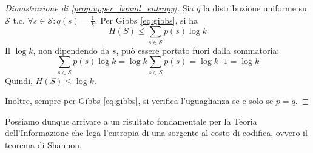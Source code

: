 \begin{proof}[Dimostrazione di \ref{prop:upper_bound_entropy}]
  Sia $q$ la distribuzione uniforme su $\mathcal{S}$ t.c. $\forall s \in \mathcal{S}:q(s)=\frac{1}{k}$.
  Per Gibbs \ref{eq:gibbs}, si ha $$H(S)\leq \sum_{s \in \mathcal{S}}{p(s)\log k}$$ 
  Il $\log k$, non dipendendo da $s$, può essere portato fuori dalla sommatoria: $$\sum_{s \in \mathcal{S}}{p(s)\log k} = \log k \sum_{s \in \mathcal{S}}{p(s)}=\log k\cdot1=\log k$$ 
  Quindi, $H(S)\leq \log k$. 
  
  Inoltre, sempre per Gibbs \ref{eq:gibbs}, si verifica l'uguaglianza se e solo se $p=q$. 
\end{proof}

Possiamo dunque arrivare a un risultato fondamentale per la Teoria dell'Informazione che lega l'entropia di una sorgente al costo di codifica, ovvero il teorema di Shannon.

